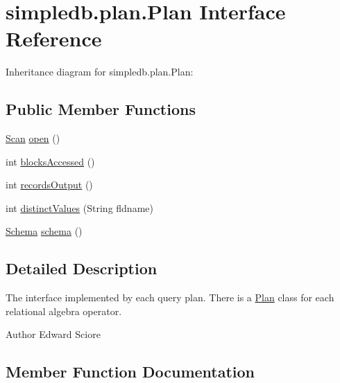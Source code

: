 \hypertarget{interfacesimpledb_1_1plan_1_1Plan}{}\section{simpledb.\+plan.\+Plan Interface Reference}
\label{interfacesimpledb_1_1plan_1_1Plan}


Inheritance diagram for simpledb.\+plan.\+Plan\+:
\subsection*{Public Member Functions}
\begin{DoxyCompactItemize}
\item 
\hyperlink{interfacesimpledb_1_1query_1_1Scan}{Scan} \hyperlink{interfacesimpledb_1_1plan_1_1Plan_aaa4c15cda4e9c0d52308850f9f13ff99}{open} ()
\item 
int \hyperlink{interfacesimpledb_1_1plan_1_1Plan_a6a333b95b956fe224812155b9d1c8202}{blocks\+Accessed} ()
\item 
int \hyperlink{interfacesimpledb_1_1plan_1_1Plan_a187e06657d356c80a7f743d7ff8fd257}{records\+Output} ()
\item 
int \hyperlink{interfacesimpledb_1_1plan_1_1Plan_a55094c16c756b0c09b5c71b94d573271}{distinct\+Values} (String fldname)
\item 
\hyperlink{classsimpledb_1_1record_1_1Schema}{Schema} \hyperlink{interfacesimpledb_1_1plan_1_1Plan_ad0ee1aa2c4e7147e9f8fc6f3301fa986}{schema} ()
\end{DoxyCompactItemize}


\subsection{Detailed Description}
The interface implemented by each query plan. There is a \hyperlink{interfacesimpledb_1_1plan_1_1Plan}{Plan} class for each relational algebra operator. \begin{DoxyAuthor}{Author}
Edward Sciore 
\end{DoxyAuthor}


\subsection{Member Function Documentation}
\mbox{\label{interfacesimpledb_1_1plan_1_1Plan_a6a333b95b956fe224812155b9d1c8202}} 
